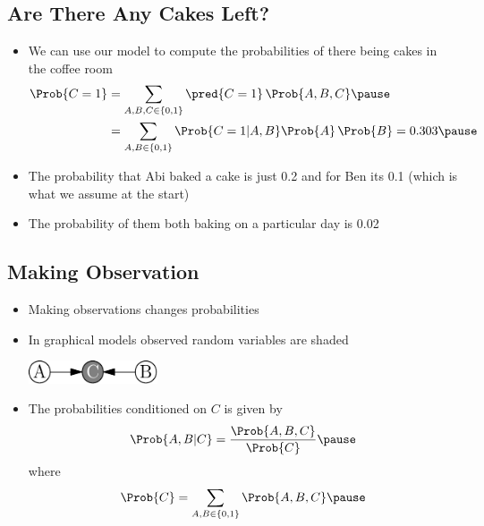 
\begin{slide}
\section{Are There Any Cakes Left?}

\begin{PauseHighLight}
  \begin{itemize}
  \item We can use our model to compute the probabilities of there
    being cakes in the coffee room
    \begin{align*}
      \Prob{C=1} &= \sum_{A,B,C\in\{0,1\}}
                   \pred{C=1}\, \Prob{A,B,C} \pause \\
      &= \sum_{A,B\in\{0,1\}}
       \Prob{C=1|A,B} \Prob{A}\,\Prob{B} = 0.303\pause
    \end{align*}
  \item The probability that Abi baked a cake is just 0.2 and for Ben
    its 0.1 (which is what we assume at the start)\pause
  \item The probability of them both baking on a particular day is 0.02\pause
  \end{itemize}
\end{PauseHighLight}

\end{slide}


\begin{slide}
\section{Making Observation}

\begin{PauseHighLight}
  \begin{itemize}
  \item Making observations changes probabilities\pause
  \item In graphical models observed random variables are shaded
    \begin{center}
      \includegraphics[width=0.3\textwidth]{figures/acob.pdf}\pause
    \end{center}
  \item The probabilities conditioned on $C$ is given by
    $$ \Prob{A,B|C} =\frac{\Prob{A,B,C}}{\Prob{C}} \pause $$
    where
    $$ \Prob{C} = \sum_{A,B\in\{0,1\}} \Prob{A,B,C} \pause $$
  \end{itemize}
\end{PauseHighLight}

\end{slide}

